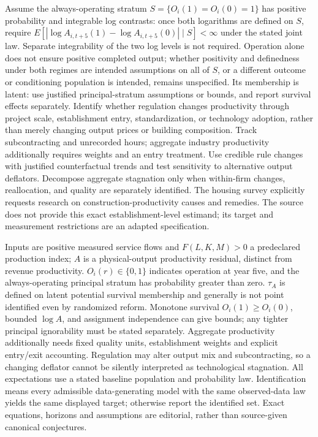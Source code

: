 \documentclass[11pt,a4paper]{article}
\begin{document}
Assume the always-operating stratum \(S=\{O_i(1)=O_i(0)=1\}\) has positive probability and integrable log contrasts: once both logarithms are defined on \(S\), require \(E[|\log A_{i,t+5}(1)-\log A_{i,t+5}(0)|\mid S]<\infty\) under the stated joint law. Separate integrability of the two log levels is not required. Operation alone does not ensure positive completed output; whether positivity and definedness under both regimes are intended assumptions on all of \(S\), or a different outcome or conditioning population is intended, remains unspecified. Its membership is latent: use justified principal-stratum assumptions or bounds, and report survival effects separately. Identify whether regulation changes productivity through project scale, establishment entry, standardization, or technology adoption, rather than merely changing output prices or building composition. Track subcontracting and unrecorded hours; aggregate industry productivity additionally requires weights and an entry treatment. Use credible rule changes with justified counterfactual trends and test sensitivity to alternative output deflators. Decompose aggregate stagnation only when within-firm changes, reallocation, and quality are separately identified. The housing survey explicitly requests research on construction-productivity causes and remedies. The source does not provide this exact establishment-level estimand; its target and measurement restrictions are an adapted specification.

Inputs are positive measured service flows and \(F(L,K,M)>0\) a predeclared production index; \(A\) is a physical-output productivity residual, distinct from revenue productivity. \(O_i(r)\in\{0,1\}\) indicates operation at year five, and the always-operating principal stratum has probability greater than zero. \(\tau_A\) is defined on latent potential survival membership and generally is not point identified even by randomized reform. Monotone survival \(O_i(1)\geq O_i(0)\), bounded \(\log A\), and assignment independence can give bounds; any tighter principal ignorability must be stated separately. Aggregate productivity additionally needs fixed quality units, establishment weights and explicit entry/exit accounting. Regulation may alter output mix and subcontracting, so a changing deflator cannot be silently interpreted as technological stagnation. All expectations use a stated baseline population and probability law. Identification means every admissible data-generating model with the same observed-data law yields the same displayed target; otherwise report the identified set. Exact equations, horizons and assumptions are editorial, rather than source-given canonical conjectures.
\end{document}
